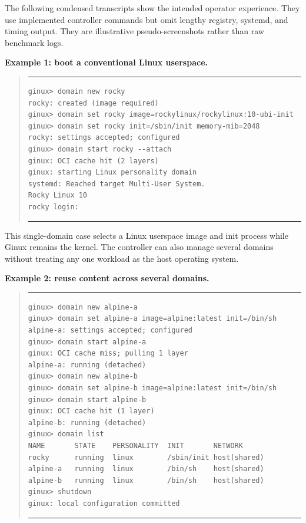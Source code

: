\documentclass[11pt]{article}
\begin{document}
The following condensed transcripts show the intended operator experience.
They use implemented controller commands but omit lengthy registry, systemd,
and timing output. They are illustrative pseudo-screenshots rather than raw
benchmark logs.

\medskip
\begin{samepage}
\noindent\textbf{Example 1: boot a conventional Linux userspace.}\par\nopagebreak\smallskip
\begin{quote}\small\hrule\vspace{4pt}
\begin{verbatim}
ginux> domain new rocky
rocky: created (image required)
ginux> domain set rocky image=rockylinux/rockylinux:10-ubi-init
ginux> domain set rocky init=/sbin/init memory-mib=2048
rocky: settings accepted; configured
ginux> domain start rocky --attach
ginux: OCI cache hit (2 layers)
ginux: starting Linux personality domain
systemd: Reached target Multi-User System.
Rocky Linux 10
rocky login:
\end{verbatim}
\vspace{2pt}\hrule
\end{quote}
\end{samepage}
\medskip

This single-domain case selects a Linux userspace image and init process while
Ginux remains the kernel. The controller can also manage several domains
without treating any one workload as the host operating system.

\medskip
\begin{samepage}
\noindent\textbf{Example 2: reuse content across several domains.}\par\nopagebreak\smallskip
\begin{quote}\small\hrule\vspace{4pt}
\begin{verbatim}
ginux> domain new alpine-a
ginux> domain set alpine-a image=alpine:latest init=/bin/sh
alpine-a: settings accepted; configured
ginux> domain start alpine-a
ginux: OCI cache miss; pulling 1 layer
alpine-a: running (detached)
ginux> domain new alpine-b
ginux> domain set alpine-b image=alpine:latest init=/bin/sh
ginux> domain start alpine-b
ginux: OCI cache hit (1 layer)
alpine-b: running (detached)
ginux> domain list
NAME       STATE    PERSONALITY  INIT       NETWORK
rocky      running  linux        /sbin/init host(shared)
alpine-a   running  linux        /bin/sh    host(shared)
alpine-b   running  linux        /bin/sh    host(shared)
ginux> shutdown
ginux: local configuration committed
\end{verbatim}
\vspace{2pt}\hrule
\end{quote}
\end{samepage}
\medskip
\end{document}
